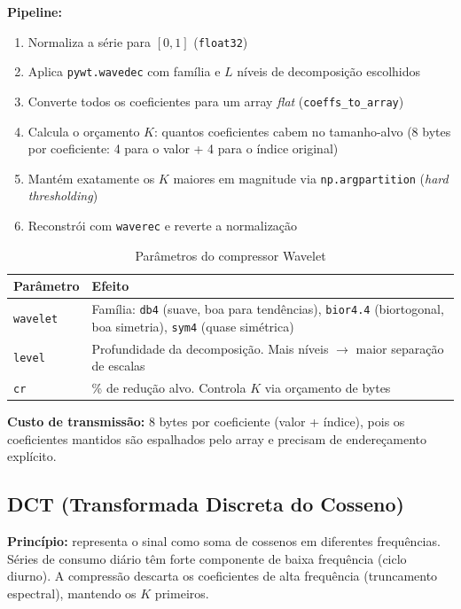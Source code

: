 \documentclass[12pt, a4paper]{article}
\begin{document}
\textbf{Pipeline:}
\begin{enumerate}
    \item Normaliza a série para $[0, 1]$ (\texttt{float32})
    \item Aplica \texttt{pywt.wavedec} com família e $L$ níveis de decomposição escolhidos
    \item Converte todos os coeficientes para um array \textit{flat} (\texttt{coeffs\_to\_array})
    \item Calcula o orçamento $K$: quantos coeficientes cabem no tamanho-alvo (8 bytes por coeficiente: 4 para o valor + 4 para o índice original)
    \item Mantém exatamente os $K$ maiores em magnitude via \texttt{np.argpartition} (\textit{hard thresholding})
    \item Reconstrói com \texttt{waverec} e reverte a normalização
\end{enumerate}

\begin{table}[H]
\centering
\caption{Parâmetros do compressor Wavelet}
\begin{tabular}{lp{9cm}}
\toprule
\textbf{Parâmetro} & \textbf{Efeito} \\
\midrule
\texttt{wavelet} & Família: \texttt{db4} (suave, boa para tendências), \texttt{bior4.4} (biortogonal, boa simetria), \texttt{sym4} (quase simétrica) \\
\texttt{level}   & Profundidade da decomposição. Mais níveis $\to$ maior separação de escalas \\
\texttt{cr}      & \% de redução alvo. Controla $K$ via orçamento de bytes \\
\bottomrule
\end{tabular}
\end{table}

\textbf{Custo de transmissão:} 8 bytes por coeficiente (valor + índice), pois os coeficientes mantidos são espalhados pelo array e precisam de endereçamento explícito.

\subsection{DCT (Transformada Discreta do Cosseno)}

\textbf{Princípio:} representa o sinal como soma de cossenos em diferentes frequências. Séries de consumo diário têm forte componente de baixa frequência (ciclo diurno). A compressão descarta os coeficientes de alta frequência (truncamento espectral), mantendo os $K$ primeiros.
\end{document}
